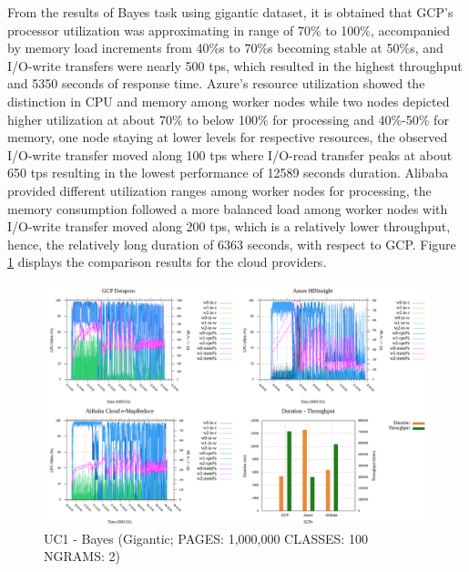 \documentclass[review]{elsarticle}
\begin{document}
From the results of Bayes task using gigantic dataset, it is obtained that GCP's processor utilization was approximating in range of 70\% to 100\%, accompanied by memory load increments from 40\%s to 70\%s becoming stable at 50\%s, and I/O-write transfers were nearly 500 tps, which resulted in the highest throughput and 5350 seconds of response time. Azure's resource utilization showed the distinction in CPU and memory among worker nodes while two nodes depicted higher utilization at about 70\% to below 100\% for processing and 40\%-50\% for memory, one node staying at lower levels for respective resources, the observed I/O-write transfer moved along 100 tps where I/O-read transfer peaks at about 650 tps resulting in the lowest performance of 12589 seconds duration. Alibaba provided different utilization ranges among worker nodes for processing, the memory consumption followed a more balanced load among worker nodes with I/O-write transfer moved along 200 tps, which is a relatively lower throughput, hence, the relatively long duration of 6363 seconds, with respect to GCP. Figure \ref{fig:uc1-bayes-g-cmidt} displays the comparison results for the cloud providers.

\begin{figure}[p]
	\caption{UC1 - Bayes (Gigantic; PAGES: 1,000,000 CLASSES: 100 NGRAMS: 2)}
	\label{fig:uc1-bayes-g-cmidt}
	\includegraphics[width=\textwidth]{uc1-bayes-g-cmidt}
	\centering
\end{figure}


\end{document}
